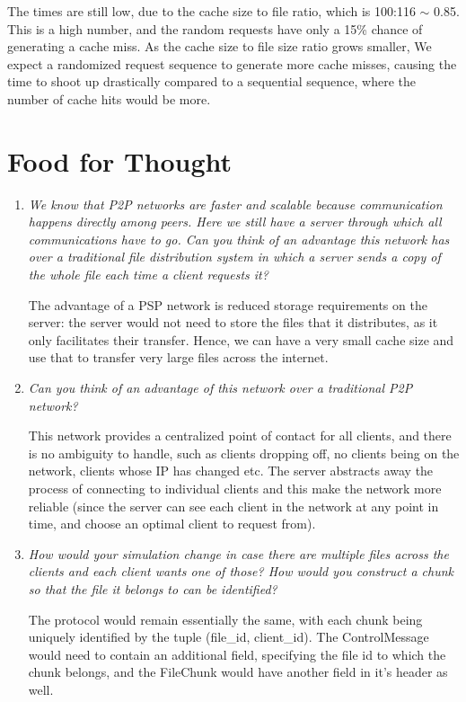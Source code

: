 \documentclass[12pt]{article}
\begin{document}
The times are still low, due to the cache size to file ratio, which is 100:116 $\sim$ 0.85. This is a high number, and the random requests have only a 15\% chance of generating a cache miss. As the cache size to file size ratio grows smaller, We expect a randomized request sequence to generate more cache misses, causing the time to shoot up drastically compared to a sequential sequence, where the number of cache hits would be more. 

\clearpage

\section{Food for Thought}

\begin{enumerate}
  \item \textit{We know that P2P networks are faster and scalable because communication happens directly among peers. Here we still have a server through which all communications have to go. Can you think of an advantage this network has over a traditional file distribution system in which a server sends a copy of the whole file each time a client requests it?}

  The advantage of a PSP network is reduced storage requirements on the server: the server would not need to store the files that it distributes, as it only facilitates their transfer. Hence, we can have a very small cache size and use that to transfer very large files across the internet.

  \item \textit{Can you think of an advantage of this network over a traditional P2P network?}

  This network provides a centralized point of contact for all clients, and there is no ambiguity to handle, such as clients dropping off, no clients being on the network, clients whose IP has changed etc. The server abstracts away the process of connecting to individual clients and this make the network more reliable (since the server can see each client in the network at any point in time, and choose an optimal client to request from).

  \item \textit{How would your simulation change in case there are multiple files across the clients and each client wants one of those? How would you construct a chunk so that the file it belongs to can be identified?}

  The protocol would remain essentially the same, with each chunk being uniquely identified by the tuple (file\_id, client\_id). The ControlMessage would need to contain an additional field, specifying the file id to which the chunk belongs, and the FileChunk would have another field in it's header as well. 

\end{enumerate}
\end{document}
